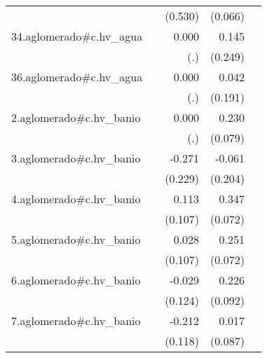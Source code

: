 {\begin{longtable}{l*{4}{D{.}{.}{-1}}}
            &                     &     (0.530)         &     (0.066)         &                     \\
\addlinespace
34.aglomerado#c.hv\_agua&                     &       0.000         &       0.145         &                     \\
            &                     &         (.)         &     (0.249)         &                     \\
\addlinespace
36.aglomerado#c.hv\_agua&                     &       0.000         &       0.042         &                     \\
            &                     &         (.)         &     (0.191)         &                     \\
\addlinespace
2.aglomerado#c.hv\_banio&                     &       0.000         &       0.230\sym{**} &                     \\
            &                     &         (.)         &     (0.079)         &                     \\
\addlinespace
3.aglomerado#c.hv\_banio&                     &      -0.271         &      -0.061         &                     \\
            &                     &     (0.229)         &     (0.204)         &                     \\
\addlinespace
4.aglomerado#c.hv\_banio&                     &       0.113         &       0.347\sym{***}&                     \\
            &                     &     (0.107)         &     (0.072)         &                     \\
\addlinespace
5.aglomerado#c.hv\_banio&                     &       0.028         &       0.251\sym{***}&                     \\
            &                     &     (0.107)         &     (0.072)         &                     \\
\addlinespace
6.aglomerado#c.hv\_banio&                     &      -0.029         &       0.226\sym{*}  &                     \\
            &                     &     (0.124)         &     (0.092)         &                     \\
\addlinespace
7.aglomerado#c.hv\_banio&                     &      -0.212         &       0.017         &                     \\
            &                     &     (0.118)         &     (0.087)         &                     \\

\end{longtable}}
